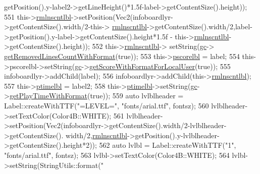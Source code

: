 \begin{DoxyCode}
      getPosition().y-label2->getLineHeight()*1.5f-label->getContentSize().height));
551     this->\hyperlink{class_hello_world_a52aca4f2a78e6413ace505d313b006fc}{rmlnscntlbl}->setPosition(Vec2(infoboardlyr->getContentSize().width/2-this->
      \hyperlink{class_hello_world_a52aca4f2a78e6413ace505d313b006fc}{rmlnscntlbl}->getContentSize().width/2,label->getPosition().y-label->getContentSize().height*1.5f
      - this->\hyperlink{class_hello_world_a52aca4f2a78e6413ace505d313b006fc}{rmlnscntlbl}->getContentSize().height));
552     this->\hyperlink{class_hello_world_a52aca4f2a78e6413ace505d313b006fc}{rmlnscntlbl}-> setString(\hyperlink{class_hello_world_a547cb213126911d9a7151f8259dc7102}{gc}->
      \hyperlink{class_tetris_1_1_game_controller_acd543d841613ed6c3645659d34e0b723}{getRemovedLinesCountWithFormat}(\textcolor{keyword}{true}));
553     this->\hyperlink{class_hello_world_a7ed25294d2c42aec8b7b8f37bbf75a38}{pscorelbl} = label;
554     this->pscorelbl->setString(\hyperlink{class_hello_world_a547cb213126911d9a7151f8259dc7102}{gc}->\hyperlink{class_tetris_1_1_game_controller_a84270bd9c52aae8ba1434d96a96b6c3c}{getScoreWithFormatForLocalUser}(\textcolor{keyword}{true}));
555     infoboardlyr->addChild(label);
556     infoboardlyr->addChild(this->\hyperlink{class_hello_world_a52aca4f2a78e6413ace505d313b006fc}{rmlnscntlbl});
557     this->\hyperlink{class_hello_world_ae0520bbadc78c24a50ddeb3f839b4012}{ptimelbl} = label2;
558     this->\hyperlink{class_hello_world_ae0520bbadc78c24a50ddeb3f839b4012}{ptimelbl}->setString(\hyperlink{class_hello_world_a547cb213126911d9a7151f8259dc7102}{gc}->\hyperlink{class_tetris_1_1_game_controller_a71765a7d8b76400832c98002a113ed26}{getPlayTimeWithFormat}(\textcolor{keyword}{true}));
559     \textcolor{keyword}{auto} lvlblheader = Label::createWithTTF(\textcolor{stringliteral}{"=LEVEL="}, \textcolor{stringliteral}{"fonts/arial.ttf"}, fontsz);
560     lvlblheader->setTextColor(Color4B::WHITE);
561     lvlblheader->setPosition(Vec2(infoboardlyr->getContentSize().width/2-lvlblheader->getContentSize().
      width/2,\hyperlink{class_hello_world_a52aca4f2a78e6413ace505d313b006fc}{rmlnscntlbl}->getPosition().y-lvlblheader->getContentSize().height*2));
562     \textcolor{keyword}{auto} lvlbl = Label::createWithTTF(\textcolor{stringliteral}{"1"}, \textcolor{stringliteral}{"fonts/arial.ttf"}, fontsz);
563     lvlbl->setTextColor(Color4B::WHITE);
564     lvlbl->setString(StringUtils::format(\textcolor{stringliteral}{"%
}
\end{DoxyCode}
